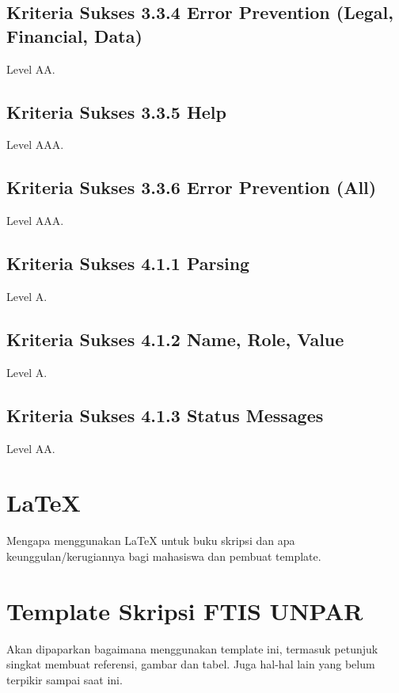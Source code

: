 \subsection{Kriteria Sukses 3.3.4 Error Prevention (Legal, Financial, Data)}
\label{sec:kriteria_3.3.4}
Level AA.

\subsection{Kriteria Sukses 3.3.5 Help}
\label{sec:kriteria_3.3.5}
Level AAA.

\subsection{Kriteria Sukses 3.3.6 Error Prevention (All)}
\label{sec:kriteria_3.3.6}
Level AAA.

\subsection{Kriteria Sukses 4.1.1 Parsing}
\label{sec:kriteria_4.1.1}
Level A.

\subsection{Kriteria Sukses 4.1.2 Name, Role, Value}
\label{sec:kriteria_4.1.2}
Level A.

\subsection{Kriteria Sukses 4.1.3 Status Messages}
\label{sec:kriteria_4.1.3}
Level AA.

\section{\LaTeX}
\label{sec:latex}

Mengapa menggunakan \LaTeX{} untuk buku skripsi dan apa keunggulan/kerugiannya bagi mahasiswa dan pembuat template. 



\section{Template Skripsi FTIS UNPAR}
\label{sec:template}
 
Akan dipaparkan bagaimana menggunakan template ini, termasuk petunjuk singkat membuat referensi, gambar dan tabel.
Juga hal-hal lain yang belum terpikir sampai saat ini. 
 
